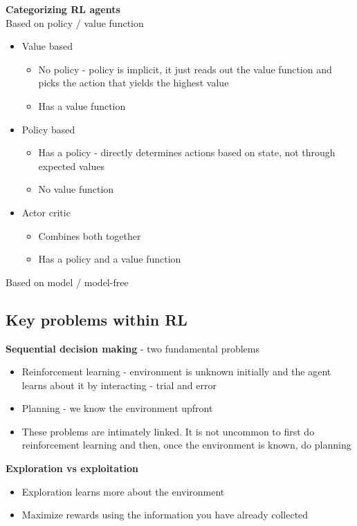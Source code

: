 \documentclass{article}
\begin{document}
\textbf{Categorizing RL agents}\\

Based on policy / value function
\begin{itemize}
    \item Value based
    \begin{itemize}
        \item No policy - policy is implicit, it just reads out the value function and picks the action that yields the highest value
        \item Has a value function
    \end{itemize}
    \item Policy based
    \begin{itemize}
        \item Has a policy - directly determines actions based on state, not through expected values 
        \item No value function
    \end{itemize}
    \item Actor critic
    \begin{itemize}
        \item Combines both together
        \item Has a policy and a value function
    \end{itemize}
\end{itemize}

Based on model / model-free

\subsection{Key problems within RL}

\textbf{Sequential decision making} - two fundamental problems
\begin{itemize}
    \item Reinforcement learning - environment is unknown initially and the agent learns about it by interacting - trial and error
    \item Planning - we know the environment upfront
    \item These problems are intimately linked. It is not uncommon to first do reinforcement learning and then, once the environment is known, do planning
\end{itemize}

\textbf{Exploration vs exploitation}
\begin{itemize}
    \item Exploration learns more about the environment
    \item Maximize rewards using the information you have already collected
\end{itemize}
\end{document}
